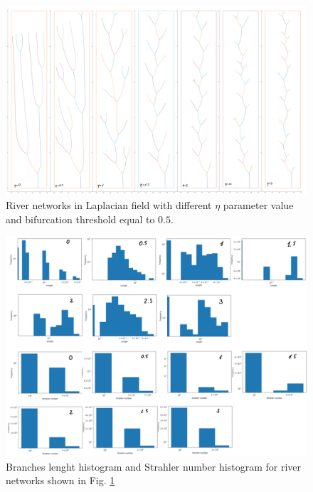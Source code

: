 \documentclass[]{pracamgr}
\begin{document}
        \begin{figure}[H]
          \centering
          \includegraphics[width=1\textwidth]{figs/sims/laplacian_field_etas.png}        
          \caption{River networks in Laplacian field with different $\eta$ parameter value and bifurcation threshold equal to $0.5$.}
          \label{laplacian_etas}
        \end{figure}

        \begin{figure}[H]
          \centering
          \includegraphics[width=1\textwidth]{figs/sims/strahler_and_leght_histogram_for_laplacian_field.png}        
          \caption{Branches lenght histogram and Strahler number histogram for river networks shown in Fig. \ref{laplacian_etas}}
        \end{figure}
\end{document}
